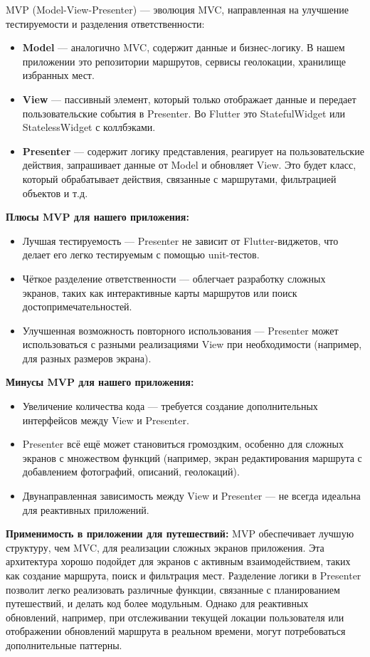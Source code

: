 MVP (Model-View-Presenter) — эволюция MVC, направленная на улучшение тестируемости и разделения ответственности:

\begin{itemize}
    \item \textbf{Model} — аналогично MVC, содержит данные и бизнес-логику. В нашем приложении это репозитории маршрутов, сервисы геолокации, хранилище избранных мест.
    \item \textbf{View} — пассивный элемент, который только отображает данные и передает пользовательские события в Presenter. Во Flutter это StatefulWidget или StatelessWidget с коллбэками.
    \item \textbf{Presenter} — содержит логику представления, реагирует на пользовательские действия, запрашивает данные от Model и обновляет View. Это будет класс, который обрабатывает действия, связанные с маршрутами, фильтрацией объектов и т.д.
\end{itemize}

\textbf{Плюсы MVP для нашего приложения:}
\begin{itemize}
    \item Лучшая тестируемость — Presenter не зависит от Flutter-виджетов, что делает его легко тестируемым с помощью unit-тестов.
    \item Чёткое разделение ответственности — облегчает разработку сложных экранов, таких как интерактивные карты маршрутов или поиск достопримечательностей.
    \item Улучшенная возможность повторного использования — Presenter может использоваться с разными реализациями View при необходимости (например, для разных размеров экрана).
\end{itemize}

\textbf{Минусы MVP для нашего приложения:}
\begin{itemize}
    \item Увеличение количества кода — требуется создание дополнительных интерфейсов между View и Presenter.
    \item Presenter всё ещё может становиться громоздким, особенно для сложных экранов с множеством функций (например, экран редактирования маршрута с добавлением фотографий, описаний, геолокаций).
    \item Двунаправленная зависимость между View и Presenter — не всегда идеальна для реактивных приложений.
\end{itemize}

\textbf{Применимость в приложении для путешествий:}
MVP обеспечивает лучшую структуру, чем MVC, для реализации сложных экранов приложения. Эта архитектура хорошо подойдет для экранов с активным взаимодействием, таких как создание маршрута, поиск и фильтрация мест. Разделение логики в Presenter позволит легко реализовать различные функции, связанные с планированием путешествий, и делать код более модульным. Однако для реактивных обновлений, например, при отслеживании текущей локации пользователя или отображении обновлений маршрута в реальном времени, могут потребоваться дополнительные паттерны.

